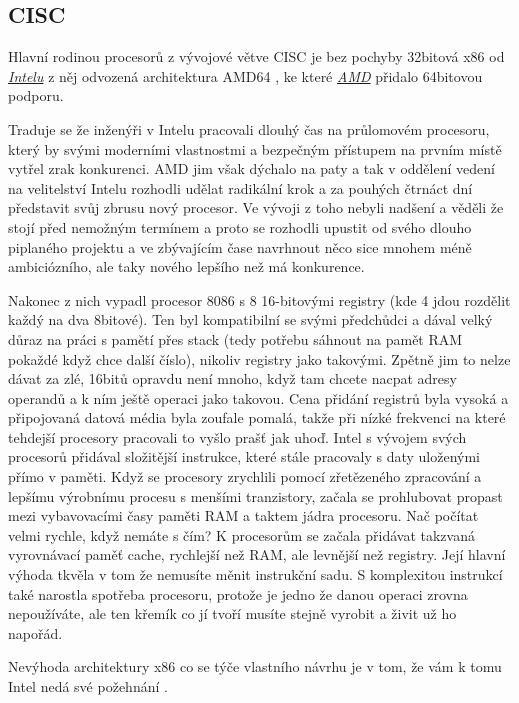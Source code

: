 \documentclass[FM,BP]{tulthesis}
\begin{document}
\subsection{CISC} \label{kap:CISC}
Hlavní rodinou procesorů z vývojové větve CISC je bez pochyby 32bitová x86 \cite{8086} od \href{https://www.intel.com/content/www/us/en/homepage.html}{\emph{Intelu}} z něj odvozená architektura AMD64 \cite{AMD64}, ke které \href{https://www.amd.com/en}{\emph{AMD}} přidalo 64bitovou podporu.

Traduje se že inženýři v Intelu pracovali dlouhý čas na průlomovém procesoru, který by svými moderními vlastnostmi a bezpečným přístupem na prvním místě vytřel zrak konkurenci. AMD jim však dýchalo na paty a tak v oddělení vedení na velitelství Intelu rozhodli udělat radikální krok a za pouhých čtrnáct dní představit svůj zbrusu nový procesor. Ve vývoji z toho nebyli nadšení a věděli že stojí před nemožným termínem a proto se rozhodli upustit od svého dlouho piplaného projektu a ve zbývajícím čase navrhnout něco sice mnohem méně ambiciózního, ale taky nového lepšího než má konkurence. 

Nakonec z nich vypadl procesor 8086 s 8 16-bitovými registry (kde 4 jdou rozdělit každý na dva 8bitové). Ten byl kompatibilní se svými předchůdci a dával velký důraz na práci s pamětí přes stack (tedy potřebu sáhnout na pamět RAM pokaždé když chce další číslo), nikoliv registry jako takovými. Zpětně jim to nelze dávat za zlé, 16bitů opravdu není mnoho, když tam chcete nacpat adresy operandů a k ním ještě operaci jako takovou. Cena přidání registrů byla vysoká a připojovaná datová média byla zoufale pomalá, takže při nízké frekvenci na které tehdejší procesory pracovali to vyšlo prašť jak uhoď. Intel s vývojem svých procesorů přidával složitější instrukce, které stále pracovaly s daty uloženými přímo v paměti. Když se procesory zrychlili pomocí zřetězeného zpracování a lepšímu výrobnímu procesu s menšími tranzistory, začala se prohlubovat propast mezi vybavovacími časy paměti RAM a taktem jádra procesoru. Nač počítat velmi rychle, když nemáte s čím? K procesorům se začala přidávat takzvaná vyrovnávací paměť cache, rychlejší než RAM, ale levnější než registry. Její hlavní výhoda tkvěla v tom že nemusíte měnit instrukční sadu. S komplexitou instrukcí také narostla spotřeba procesoru, protože je jedno že danou operaci zrovna nepoužíváte, ale ten křemík co jí tvoří musíte stejně vyrobit a živit už ho napořád.

Nevýhoda architektury x86 co se týče vlastního návrhu je v tom, že vám k tomu Intel nedá své požehnání \cite{wiki_X86}.
\end{document}
